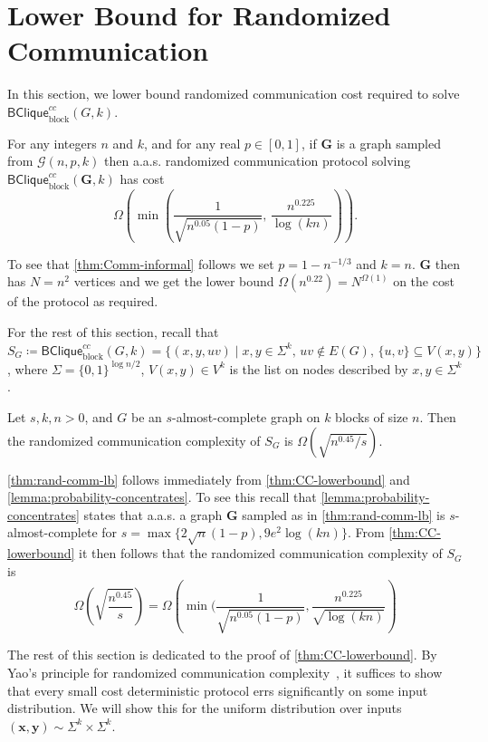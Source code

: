 \documentclass[10pt,a4paper]{article}
\makeatletter
\theoremstyle{definition}
\theoremstyle{remark}
\theoremstyle{example}
\theoremstyle{plain}
\newcommand{\calG}{\mathcal{G}}
\newcommand{\binCliqueBlockComm}[2]
{\mathsf{BClique}_{\textrm{block}}^{cc}(#1,#2)}
\newcommand{\aas}{a.a.s.\@\xspace}
\newcommand{\ndense}{almost-complete\xspace}
\makeatother
\begin{document}
\section{Lower Bound for Randomized Communication} \label{sec:binCliqueRandComm}
In this section, we lower bound randomized communication cost required to solve $\binCliqueBlockComm{G}{k}$.
\begin{theorem}
\label{thm:rand-comm-lb}
    For any
    integers $n$ and $k$, and for any real $p \in [0,1]$, 
    if $\bm G$ is a graph sampled from $\calG(n,p,k)$ then \aas randomized communication protocol solving $\binCliqueBlockComm{\bm G}{k}$ has cost 
    \begin{equation*}
        \Omega\left({\min\left(
    \frac{1}{\sqrt{n^{0.05}(1-p)}},
    \,
    \frac{n^{0.225}}{\log(kn)}\right)}\right).
    \end{equation*}
\end{theorem}

   To see that \autoref{thm:Comm-informal} follows we set $p = 1-n^{-1/3}$ and $k=n$. $\bm G$ then has $N=n^2$ vertices and we get the lower bound $\Omega(n^{0.22})=N^{\Omega(1)}$ on the cost of the protocol as required.

For the rest of this section, recall that $S_{G} \coloneqq \binCliqueBlockComm{G}{k} = \{(x, y, uv) \mid x, y \in \Sigma^k,\, uv \not\in E( G),\, \{u,v\} \subseteq V(x,y)\}$, where $\Sigma = \{0,1\}^{\log n / 2}$, $V(x,y) \in V^k$ is the list on nodes described by $x,y\in \Sigma^k$.
\begin{theorem}
\label{thm:CC-lowerbound}
    Let $s,k,n>0$, and $G$ be an $s$-\ndense graph on $k$ blocks of size $n$.
    Then the randomized communication complexity of $S_G$ is $\Omega(\sqrt{n^{0.45}/s})$.
\end{theorem}
\autoref{thm:rand-comm-lb} follows immediately from \autoref{thm:CC-lowerbound} and \autoref{lemma:probability-concentrates}. To see this recall that \autoref{lemma:probability-concentrates} states that \aas a graph $\bm G$ sampled as in \autoref{thm:rand-comm-lb} is $s$-\ndense for $s={\max\{2\sqrt{n}(1-p),9e^2\log(kn)\}}$. From \autoref{thm:CC-lowerbound} it then follows that the randomized communication complexity of $S_G$ is
\[\Omega\left(\sqrt{\frac{n^{0.45}}{s}}\right)=\Omega\left(\min(\frac{1}{\sqrt{n^{0.05}(1-p)}},\frac{n^{0.225}}{\sqrt{\log(kn)}}\right)\]




The rest of this section is dedicated to the proof of \autoref{thm:CC-lowerbound}. By Yao's principle for randomized communication complexity~\cite{yao83}, it suffices to show that every small cost deterministic protocol errs significantly on some input distribution. We will show this for the uniform distribution over inputs $(\bm x, \bm y) \sim \Sigma^k \times \Sigma^k$.
\end{document}
